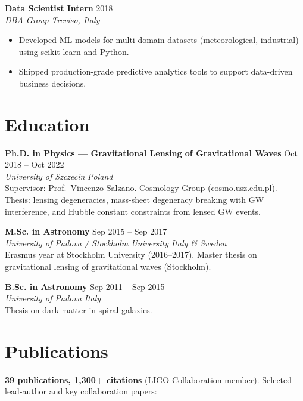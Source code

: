 \documentclass[10pt,a4paper]{article}
\newcommand{\cventry}[4]{%
  {\textbf{#1}} \hfill {\small #2}\\[-3pt]
  {\textit{\small #3}} \hfill {\textit{\small #4}}%
}
\begin{document}
\vspace{4pt}
\cventry{Data Scientist Intern}{2018}{DBA Group}{Treviso, Italy}
\begin{itemize}[noitemsep, topsep=3pt, leftmargin=1.2em]
  \item Developed ML models for multi-domain datasets (meteorological, industrial) using
        scikit-learn and Python.
  \item Shipped production-grade predictive analytics tools to support data-driven business decisions.
\end{itemize}

\section{Education}

\cventry{Ph.D. in Physics --- Gravitational Lensing of Gravitational Waves}{Oct 2018 -- Oct 2022}{University of Szczecin}{Poland}\\[1pt]
{\small Supervisor: Prof.\ Vincenzo Salzano. Cosmology Group (\href{http://cosmo.usz.edu.pl/}{cosmo.usz.edu.pl}).
Thesis: lensing degeneracies, mass-sheet degeneracy breaking with GW interference, and Hubble constant
constraints from lensed GW events.}

\vspace{4pt}
\cventry{M.Sc. in Astronomy}{Sep 2015 -- Sep 2017}{University of Padova / Stockholm University}{Italy \& Sweden}\\[1pt]
{\small Erasmus year at Stockholm University (2016--2017). Master thesis on gravitational lensing of
gravitational waves (Stockholm).}

\vspace{4pt}
\cventry{B.Sc. in Astronomy}{Sep 2011 -- Sep 2015}{University of Padova}{Italy}\\[1pt]
{\small Thesis on dark matter in spiral galaxies.}

\section{Publications}

\textbf{39 publications, 1,300+ citations} (LIGO Collaboration member). Selected lead-author and
key collaboration papers:
\end{document}
